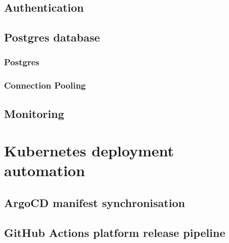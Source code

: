 \subsection{Authentication}
\subsection{Postgres database}
\subsubsection{Postgres}
\subsubsection{Connection Pooling}
\subsection{Monitoring}

\section{Kubernetes deployment automation}
\subsection{ArgoCD manifest synchronisation}
\subsection{GitHub Actions platform release pipeline}